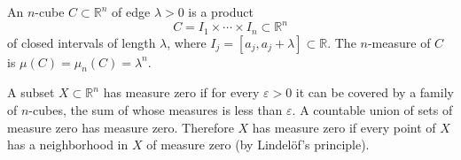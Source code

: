 An $n$-cube $C \subset \mathbb{R}^n$ of edge $\lambda > 0$ is a product
$$C = I_1 \times \cdots \times I_n \subset \mathbb{R}^n$$
of closed intervals of length $\lambda$, where $I_j = [a_j, a_j + \lambda] \subset \mathbb{R}$. The $n$-measure of $C$ is $\mu(C) = \mu_n(C) = \lambda^n$.

A subset $X \subset \mathbb{R}^n$ has measure zero if for every $\varepsilon > 0$ it can be covered by a family of $n$-cubes, the sum of whose measures is less than $\varepsilon$. A countable union of sets of measure zero has measure zero. Therefore $X$ has measure zero if every point of $X$ has a neighborhood in $X$ of measure zero (by Lindelöf's principle).
